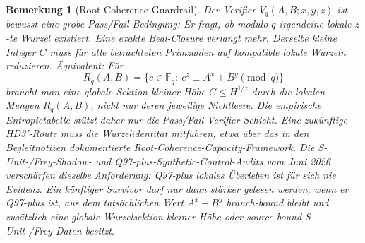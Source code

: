 \documentclass[11pt,a4paper]{article}
\newtheorem{remark}[theorem]{Bemerkung}
\begin{document}
\begin{remark}[Root-Coherence-Guardrail]
Der Verifier $V_q(A,B;x,y,z)$ ist bewusst eine grobe Pass/Fail-Bedingung:
Er fragt, ob modulo $q$ irgendeine lokale $z$-te Wurzel existiert. Eine
exakte Beal-Closure verlangt mehr. Derselbe kleine Integer $C$ muss für
alle betrachteten Primzahlen auf kompatible lokale Wurzeln reduzieren.
Äquivalent: Für
\[
  R_q(A,B)=\{c\in\mathbb F_q:\ c^z\equiv A^x+B^y\pmod q\}
\]
braucht man eine globale Sektion kleiner Höhe $C\le H^{1/z}$ durch die
lokalen Mengen $R_q(A,B)$, nicht nur deren jeweilige Nichtleere. Die
empirische Entropietabelle stützt daher nur die Pass/Fail-Verifier-Schicht.
Eine zukünftige HD3'-Route muss die Wurzelidentität mitführen, etwa über
das in den Begleitnotizen dokumentierte Root-Coherence-Capacity-Framework.
Die S-Unit-/Frey-Shadow- und Q97-plus-Synthetic-Control-Audits vom Juni
2026 verschärfen dieselbe Anforderung: Q97-plus lokales Überleben ist
für sich nie Evidenz. Ein künftiger Survivor darf nur dann stärker
gelesen werden, wenn er Q97-plus ist, aus dem tatsächlichen Wert
$A^x+B^y$ branch-bound bleibt und zusätzlich eine globale Wurzelsektion
kleiner Höhe oder source-bound S-Unit-/Frey-Daten besitzt.
\end{remark}
\end{document}
